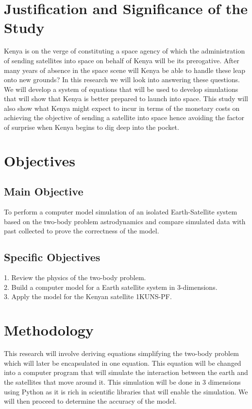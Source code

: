 \section{Justification and Significance of the Study}
Kenya is on the verge of constituting a space agency of which the administration of sending satellites into space on behalf of Kenya will be its prerogative. After many years of absence in the space scene will Kenya be able to handle these leap onto new grounds? In this research we will look into answering these questions. 
We will develop a system of equations that will be used to develop simulations that will show that Kenya is better prepared to launch into space. This study will also show what Kenya might expect to incur in terms of the monetary costs on achieving the objective of sending a satellite into space hence avoiding the factor of surprise when Kenya begins to dig deep into the pocket.
\section{Objectives}
\subsection{Main Objective}
To perform a computer model simulation of an isolated Earth-Satellite system based on the two-body problem astrodynamics and compare simulated data with past collected to prove the correctness of the model.
\subsection{Specific Objectives}
1. Review the physics of the two-body problem.\\                                                                                                                                                                       2. Build a computer model for a Earth satellite system in 3-dimensions.\\
3. Apply the model for the Kenyan satellite 1KUNS-PF.
\section{Methodology}
This research will involve deriving equations simplifying the two-body problem which will later be encapsulated in one equation.  This equation will be changed into a computer program that will simulate the interaction between the earth and the satellites that move around it. This simulation will be done in 3 dimensions using Python as it is rich in scientific libraries that will enable the simulation. We will then proceed to determine the accuracy of the model.